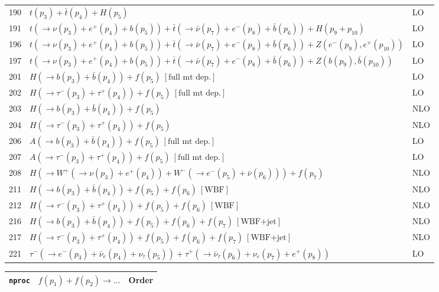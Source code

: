 \documentclass[12pt]{article}
\begin{document}
\begin{itemize}
\begin{table}
\begin{center}
\begin{tabular}{|l|l|l|}
\hline 
190& $t(p_3)+\bar{t}(p_4)+H(p_5) $ & LO \\
191& $ t(\to \nu(p_3)+e^+(p_4)+b(p_5))+\bar{t}(\to \bar{\nu}(p_7)+e^-(p_8)+\bar{b}(p_6))+H(p_9+p_{10}) $ & LO \\
\hline 
196& $ t(\to \nu(p_3)+e^+(p_4)+b(p_5))+\bar{t}(\to \bar{\nu}(p_7)+e^-(p_8)+\bar{b}(p_6))+Z(e^-(p_9),e^+(p_{10})) $ & LO \\
197& $ t(\to \nu(p_3)+e^+(p_4)+b(p_5))+\bar{t}(\to \bar{\nu}(p_7)+e^-(p_8)+\bar{b}(p_6))+Z(b(p_9),\bar{b}(p_{10})) $ & LO \\
\hline 
201& $ H(\to b(p_3)+\bar{b}(p_4)) + f(p_5) ~[ \mbox{full mt dep.} ] $ & LO \\
202& $ H(\to \tau^-(p_3)+\tau^+(p_4)) + f(p_5) ~[ \mbox{full mt dep.} ] $ & LO \\
203& $ H(\to b(p_3)+\bar{b}(p_4)) + f(p_5) $ & NLO \\
204& $ H(\to \tau^-(p_3)+\tau^+(p_4)) + f(p_5) $ & NLO \\
206& $ A(\to b(p_3)+\bar{b}(p_4)) + f(p_5) ~[ \mbox{full mt dep.} ] $ & LO \\
207& $ A(\to \tau^-(p_3)+\tau^+(p_4)) + f(p_5) ~[ \mbox{full mt dep.} ] $ & LO \\
208& $ H(\to W^+(\to \nu(p_3)+e^+(p_4))+W^-(\to e^-(p_5)+\bar{\nu}(p_6)))+f(p_7)$ & NLO \\
\hline 
211& $ H(\to b(p_3)+\bar{b}(p_4))+f(p_5)+f(p_6) ~[ \mbox{WBF} ] $ & NLO \\
212& $ H(\to \tau^-(p_3)+\tau^+(p_4))+f(p_5)+f(p_6) ~[ \mbox{WBF} ] $ & NLO \\
216& $ H(\to b(p_3)+\bar{b}(p_4))+f(p_5)+f(p_6)+f(p_7) ~[ \mbox{WBF+jet} ] $ & NLO \\
217& $ H(\to \tau^-(p_3)+\tau^+(p_4))+f(p_5)+f(p_6)+f(p_7) ~[ \mbox{WBF+jet} ] $ & NLO \\
\hline 
221& $ \tau^-(\to e^-(p_3)+\bar{\nu}_e(p_4)+\nu_\tau(p_5))+\tau^+(\to \bar{\nu}_\tau(p_6)+\nu_e(p_7)+e^+(p_8)) $ & LO \\
\hline 
\end{tabular}
\end{center}
\end{table}
\begin{table}
\begin{center}
\hspace*{-1.5cm}
\begin{tabular}{|l|l|l|}
\hline
{\tt nproc} & $ f(p_1)+f(p_2) \to \ldots $& Order \\ 
\hline


\end{tabular}
\end{center}
\end{table}
\end{itemize}
\end{document}
